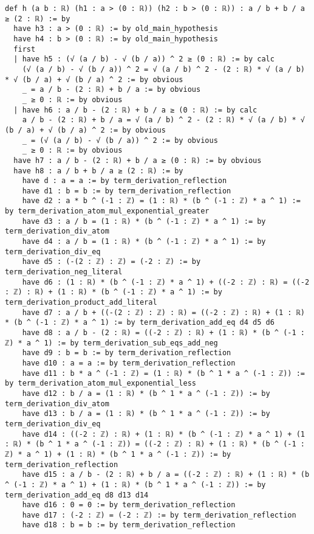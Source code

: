 \documentclass{article}
\begin{document}
\begin{tcolorbox}[colback=white!10, width=\linewidth]
\begin{lstlisting}[language=Lean4]
def h (a b : ℝ) (h1 : a > (0 : ℝ)) (h2 : b > (0 : ℝ)) : a / b + b / a ≥ (2 : ℝ) := by
  have h3 : a > (0 : ℝ) := by old_main_hypothesis
  have h4 : b > (0 : ℝ) := by old_main_hypothesis
  first
  | have h5 : (√ (a / b) - √ (b / a)) ^ 2 ≥ (0 : ℝ) := by calc
    (√ (a / b) - √ (b / a)) ^ 2 = √ (a / b) ^ 2 - (2 : ℝ) * √ (a / b) * √ (b / a) + √ (b / a) ^ 2 := by obvious
    _ = a / b - (2 : ℝ) + b / a := by obvious
    _ ≥ 0 : ℝ := by obvious
  | have h6 : a / b - (2 : ℝ) + b / a ≥ (0 : ℝ) := by calc
    a / b - (2 : ℝ) + b / a = √ (a / b) ^ 2 - (2 : ℝ) * √ (a / b) * √ (b / a) + √ (b / a) ^ 2 := by obvious
    _ = (√ (a / b) - √ (b / a)) ^ 2 := by obvious
    _ ≥ 0 : ℝ := by obvious
  have h7 : a / b - (2 : ℝ) + b / a ≥ (0 : ℝ) := by obvious
  have h8 : a / b + b / a ≥ (2 : ℝ) := by
    have d : a = a := by term_derivation_reflection
    have d1 : b = b := by term_derivation_reflection
    have d2 : a * b ^ (-1 : ℤ) = (1 : ℝ) * (b ^ (-1 : ℤ) * a ^ 1) := by term_derivation_atom_mul_exponential_greater
    have d3 : a / b = (1 : ℝ) * (b ^ (-1 : ℤ) * a ^ 1) := by term_derivation_div_atom
    have d4 : a / b = (1 : ℝ) * (b ^ (-1 : ℤ) * a ^ 1) := by term_derivation_div_eq
    have d5 : (-(2 : ℤ) : ℤ) = (-2 : ℤ) := by term_derivation_neg_literal
    have d6 : (1 : ℝ) * (b ^ (-1 : ℤ) * a ^ 1) + ((-2 : ℤ) : ℝ) = ((-2 : ℤ) : ℝ) + (1 : ℝ) * (b ^ (-1 : ℤ) * a ^ 1) := by term_derivation_product_add_literal
    have d7 : a / b + ((-(2 : ℤ) : ℤ) : ℝ) = ((-2 : ℤ) : ℝ) + (1 : ℝ) * (b ^ (-1 : ℤ) * a ^ 1) := by term_derivation_add_eq d4 d5 d6
    have d8 : a / b - (2 : ℝ) = ((-2 : ℤ) : ℝ) + (1 : ℝ) * (b ^ (-1 : ℤ) * a ^ 1) := by term_derivation_sub_eqs_add_neg
    have d9 : b = b := by term_derivation_reflection
    have d10 : a = a := by term_derivation_reflection
    have d11 : b * a ^ (-1 : ℤ) = (1 : ℝ) * (b ^ 1 * a ^ (-1 : ℤ)) := by term_derivation_atom_mul_exponential_less
    have d12 : b / a = (1 : ℝ) * (b ^ 1 * a ^ (-1 : ℤ)) := by term_derivation_div_atom
    have d13 : b / a = (1 : ℝ) * (b ^ 1 * a ^ (-1 : ℤ)) := by term_derivation_div_eq
    have d14 : ((-2 : ℤ) : ℝ) + (1 : ℝ) * (b ^ (-1 : ℤ) * a ^ 1) + (1 : ℝ) * (b ^ 1 * a ^ (-1 : ℤ)) = ((-2 : ℤ) : ℝ) + (1 : ℝ) * (b ^ (-1 : ℤ) * a ^ 1) + (1 : ℝ) * (b ^ 1 * a ^ (-1 : ℤ)) := by term_derivation_reflection
    have d15 : a / b - (2 : ℝ) + b / a = ((-2 : ℤ) : ℝ) + (1 : ℝ) * (b ^ (-1 : ℤ) * a ^ 1) + (1 : ℝ) * (b ^ 1 * a ^ (-1 : ℤ)) := by term_derivation_add_eq d8 d13 d14
    have d16 : 0 = 0 := by term_derivation_reflection
    have d17 : (-2 : ℤ) = (-2 : ℤ) := by term_derivation_reflection
    have d18 : b = b := by term_derivation_reflection

\end{lstlisting}
\end{tcolorbox}
\end{document}
